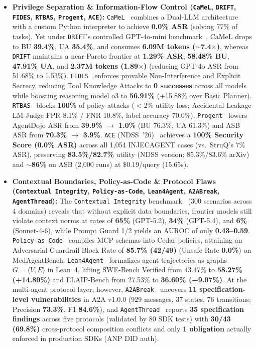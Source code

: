 \documentclass[10pt,twocolumn]{article}
\begin{document}
\begin{itemize}
  \item \textbf{Privilege Separation \& Information-Flow Control (\texttt{CaMeL}, \texttt{DRIFT}, \texttt{FIDES}, \texttt{RTBAS}, \texttt{Progent}, \texttt{ACE}):} \texttt{CaMeL}~\cite{debenedetti2026camel} combines a Dual-LLM architecture with a custom Python interpreter to achieve \textbf{0.0\% ASR} (solving 77\% of tasks). Yet under \texttt{DRIFT}'s controlled GPT-4o-mini benchmark~\cite{li2025drift}, CaMeL drops to BU \textbf{39.4\%}, UA \textbf{35.4\%}, and consumes \textbf{6.09M tokens ($\sim$7.4$\times$)}, whereas \texttt{DRIFT} maintains a near-Pareto frontier at \textbf{1.29\% ASR}, \textbf{58.48\% BU}, \textbf{47.91\% UA}, and \textbf{2.37M tokens (1.89$\times$)} (reducing GPT-4o ASR from 51.68\% to 1.53\%). \texttt{FIDES}~\cite{costa2025fides} enforces provable Non-Interference and Explicit Secrecy, reducing Tool Knowledge Attacks to \textbf{0 successes} across all models while boosting reasoning model o3 to \textbf{56.91\%} (+15.88\% over Basic Planner). \texttt{RTBAS}~\cite{zhong2025rtbas} blocks \textbf{100\%} of policy attacks ($<2\%$ utility loss; Accidental Leakage LM-Judge FPR 8.1\% / FNR 10.8\%, label accuracy 70.0\%). \texttt{Progent}~\cite{shi2025progent} lowers AgentDojo ASR from \textbf{39.9\% $\to$ 1.0\%} (BU 76.3\%, UA 61.3\%) and ASB ASR from \textbf{70.3\% $\to$ 3.9\%}. \texttt{ACE} (NDSS~'26)~\cite{li2026ace} achieves a \textbf{100\% Security Score (0.0\% ASR)} across all 1,054 INJECAGENT cases (vs.\ StruQ's 7\% ASR), preserving \textbf{83.5\%/82.7\%} utility (NDSS version; 85.3\%/83.6\% arXiv) and \textbf{$\sim$86\%} on ASB (2,000 runs) at \$0.19/query (15.65s).
  \item \textbf{Contextual Boundaries, Policy-as-Code \& Protocol Flaws (\texttt{Contextual Integrity}, \texttt{Policy-as-Code}, \texttt{Lean4Agent}, \texttt{A2ABreak}, \texttt{AgentThread}):} The \texttt{Contextual Integrity} benchmark~\cite{abdelnabi2026ci} (300 scenarios across 4 domains) reveals that without explicit data boundaries, frontier models still violate context norms at rates of \textbf{65\%} (GPT-5.2), \textbf{34\%} (GPT-5.4), and \textbf{6\%} (Sonnet-4-6), while Prompt Guard 1/2 yields an AUROC of only \textbf{0.43--0.59}. \texttt{Policy-as-Code}~\cite{mondl2026policyascode} compiles MCP schemas into Cedar policies, attaining an Adversarial Guardrail Block Rate of \textbf{85.7\% (42/49)} (Unsafe Rate \textbf{0.0\%}) on MedAgentBench. \texttt{Lean4Agent}~\cite{wang2026lean4agent} formalizes agent trajectories as graphs $G = \langle V, E \rangle$ in Lean~4, lifting SWE-Bench Verified from 43.47\% to \textbf{58.27\% (+14.80\%)} and ELAIP-Bench from 27.53\% to \textbf{36.60\% (+9.07\%)}. At the multi-agent protocol layer, however, \texttt{A2ABreak}~\cite{lotfi2026a2abreak} uncovers \textbf{11 specification-level vulnerabilities} in A2A v1.0.0 (929 messages, 37 states, 76 transitions; Precision \textbf{73.3\%}, F1 \textbf{84.6\%}), and \texttt{AgentThread}~\cite{agentthread2026} reports \textbf{35 specification findings} across five protocols (validated by 80 SDK tests) with \textbf{30/43 (69.8\%)} cross-protocol composition conflicts and only \textbf{1 obligation} actually enforced in production SDKs (ANP DID auth).

\end{itemize}
\end{document}
